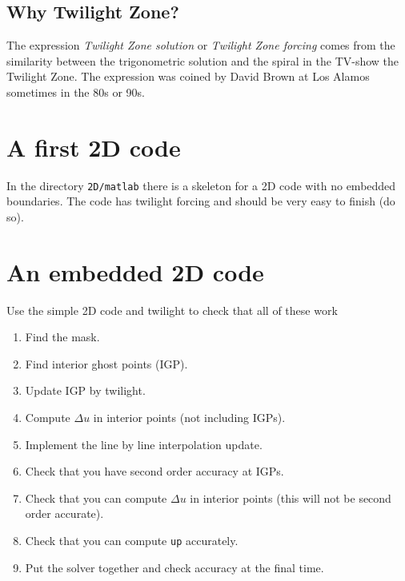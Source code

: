 \documentclass[11pt]{article}
\begin{document}
\subsection*{Why Twilight Zone?}
The expression \emph{Twilight Zone solution} or \emph{Twilight Zone forcing} comes from the similarity between the trigonometric solution and the spiral in the TV-show the Twilight Zone. The expression was coined by David Brown at Los Alamos sometimes in the 80s or 90s.   


\clearpage

\section{A first 2D code}
In the directory \verb+2D/matlab+ there is a skeleton for a 2D code with no embedded boundaries. The code has twilight forcing and should be very easy to finish (do so).   

\section{An embedded 2D code}
Use the simple 2D code and twilight to check that all of these work 
\begin{enumerate}
\item Find the mask.
\item Find interior ghost points (IGP).
\item Update IGP by twilight. 
\item Compute $\Delta u$ in interior points (not including IGPs).
\item Implement the line by line interpolation update.
\item Check that you have second order accuracy at IGPs.
\item Check that you can compute $\Delta u$ in interior points (this will not be second order accurate).
\item Check that you can compute \verb+up+ accurately.
\item Put the solver together and check accuracy at the final time. 
\end{enumerate}




\end{document}
